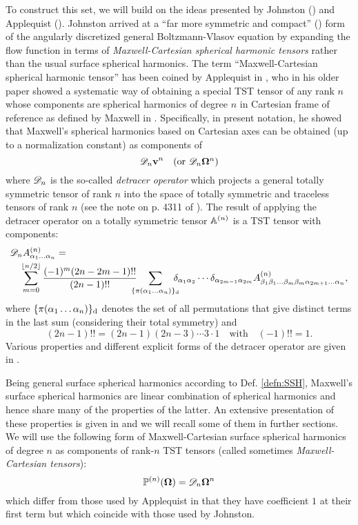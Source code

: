 To construct this set, we will build on the ideas presented by Johnston (\cite{Johnston1}) and Applequist
(\cite{Applequist1}). Johnston arrived at a ``far more symmetric and compact'' (\cite[p. 1455]{Johnston1}) form of the
angularly discretized general Boltzmann-Vlasov equation by expanding the flow function in terms of
\textit{Maxwell-Cartesian spherical harmonic tensors} rather than the usual surface spherical harmonics. The term
``Maxwell-Cartesian spherical harmonic tensor'' has been coined by Applequist in \cite{Applequist2}, who in his older
paper \cite{Applequist1} showed a systematic way of obtaining a special TST tensor of any rank $n$ whose components are
spherical harmonics of degree $n$ in Cartesian frame of reference as defined by Maxwell in \cite[p. 160]{Maxwell}.
Specifically, in present notation, he showed that Maxwell's spherical harmonics based on Cartesian axes can be obtained
(up to a normalization constant) as components of $$
  \detr \bv^n \quad \mbox{(or $\detr \bomega^n$)}
$$ where $\detr$ is the so-called \textit{detracer operator} which projects a general totally symmetric tensor of rank
$n$ into the space of totally symmetric and traceless tensors of rank $n$ (see the note on p. 4311 of
\cite{Applequist1}). The result of applying the detracer operator on a totally symmetric tensor $\AA$ is a TST tensor
with components:
\begin{equation}\label{eq:detr}
\begin{multlined}
  \detr \AAA{\alpha_1\ldots\alpha_n} = \\ \suma[m]{0}{\lfloor n/2 \rfloor} \frac{(-1)^m(2n-2m-1)!!
  }{(2n-1)!!}\quad\sum_{\mathclap{\{\perm{\alpha_1\ldots\alpha_n}\}_{\text{d}}}}\quad\kron{\alpha_1}{\alpha_2}\cdots\kron{\alpha_{2m-1}}{\alpha_{2m}}\AAA{\beta_1\beta_1\ldots\beta_m\beta_m\alpha_{2m+1}\ldots\alpha_n},
\end{multlined}
\end{equation}
where $\{\perm{\alpha_1\ldots\alpha_n}\}_{\text{d}}$ denotes the set of all permutations that give distinct terms in 
the last sum (considering their total symmetry) and $$(2n-1)!! = (2n-1)(2n-3)\cdots 3\cdot 1 \quad \mbox{with}\quad
(-1)!! = 1.$$
Various properties and different explicit forms of the detracer operator are given in \cite[Sec. 5]{Applequist1}.

Being general surface spherical harmonics according to Def. \ref{defn:SSH}, Maxwell's surface spherical harmonics are
linear combination of spherical harmonics and hence share many of the properties of the latter. An extensive presentation
of these properties is given in \cite{Applequist1,Applequist2} and we will recall some of them in further sections. We
will use the following form of Maxwell-Cartesian surface spherical harmonics of degree $n$ as components of rank-$n$ TST
tensors (called sometimes \textit{Maxwell-Cartesian tensors}):
\begin{equation}\label{eq:MCSH}
  \PP(\bomega) = \detr \bomega^n
\end{equation}
which differ from those used by Applequist in that they have coefficient $1$ at their first term but which coincide 
with those used by Johnston. 
 
